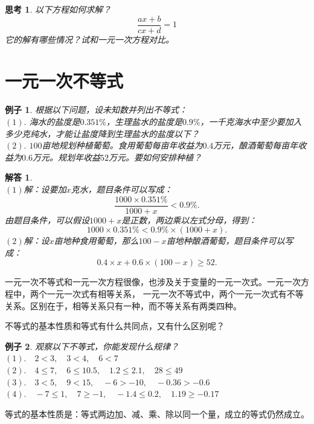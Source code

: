 \documentclass[12pt,UTF8]{ctexbook}
\newtheorem{ex}{例子}[section]
\newtheorem{sk}{思考}[section]
\newtheorem*{so}{解答}
\begin{document}
\begin{sk}\label{sk:4-0-0}
    以下方程如何求解？
    $$ \frac{ax + b}{cx + d} = 1$$
    它的解有哪些情况？试和一元一次方程对比。
\end{sk}

\section{一元一次不等式}

\begin{ex}\label{ex:4-1-0}
    根据以下问题，设未知数并列出不等式：\\
    $(1).$ 海水的盐度是$0.351\%$，生理盐水的盐度是$0.9\%$，一千克海水中至少要加入多少克纯水，才能让盐度降到生理盐水的盐度以下？\\
    $(2).$ $100$亩地规划种植葡萄。食用葡萄每亩年收益为$0.4$万元，酿酒葡萄每亩年收益为$0.6$万元。规划年收益$52$万元。要如何安排种植？
\end{ex}
\begin{so}
    \mbox{} \\
    $(1)$解：设要加$x$克水，题目条件可以写成：
    $$ \frac{1000 \times 0.351\%}{1000 + x} < 0.9\%.$$
    由题目条件，可以假设$1000+x$是正数，两边乘以左式分母，得到：
    $$ 1000 \times 0.351\% < 0.9\% \times (1000 + x).$$
    $(2)$解：设$x$亩地种食用葡萄，那么$100 - x$亩地种酿酒葡萄，题目条件可以写成：
    $$ 0.4 \times x + 0.6 \times (100 - x) \geqslant 52.$$
\end{so}
一元一次不等式和一元一次方程很像，也涉及关于变量的一元一次式。一元一次方程中，两个一元一次式有相等关系，
一元一次不等式中，两个一元一次式有不等关系。区别在于，相等关系只有一种，而不等关系有两类四种。

不等式的基本性质和等式有什么共同点，又有什么区别呢？
\begin{ex}\label{ex:4-1-10}
    观察以下不等式，你能发现什么规律？\\
    $(1).\quad 2 < 3, \quad 3 < 4, \quad 6 < 7$ \\
    $(2). \quad 4 \leqslant 7, \quad 6 \leqslant 10.5, \quad 1.2 \leqslant 2.1, \quad 28 \leqslant 49$ \\
    $(3). \quad 3 < 5, \quad 9 < 15, \quad -6 > -10, \quad -0.36 > -0.6$ \\
    $(4). \quad -7 \leqslant 1, \quad 7 \geqslant -1, \quad -1.4 \leqslant 0.2, \quad 1.19 \geqslant -0.17$ 
\end{ex}

等式的基本性质是：等式两边加、减、乘、除以同一个量，成立的等式仍然成立。
\end{document}

